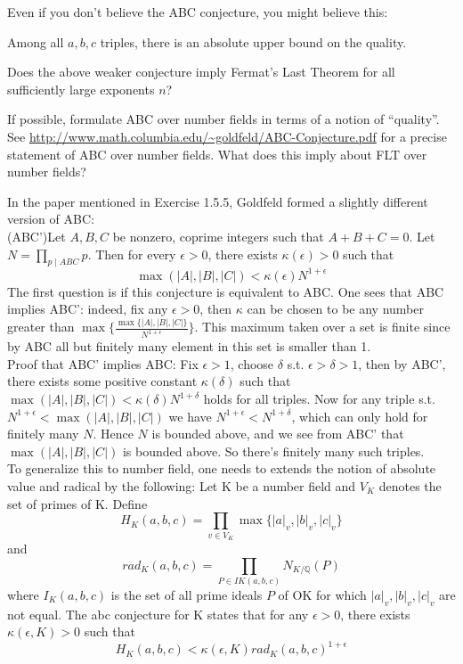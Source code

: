 \documentclass{book}
\begin{document}
Even if you don't believe the ABC conjecture, you might believe this:
\begin{conjecture}
Among all $a,b,c$ triples, there is an absolute upper
bound on the quality.
\end{conjecture}

\begin{exercise}
Does the above weaker conjecture imply Fermat's Last Theorem for all sufficiently large exponents $n$?
\end{exercise}

\begin{exercise}
If possible, formulate ABC over number fields in terms of a notion of ``quality''.  See \url{http://www.math.columbia.edu/~goldfeld/ABC-Conjecture.pdf} for a precise statement of ABC over number fields.
What does this imply about FLT over number fields?
\end{exercise}

In the paper mentioned in Exercise 1.5.5, Goldfeld
formed a slightly different version of ABC: \\

(ABC')Let $A,B,C$ be nonzero, coprime integers such that
$A+B+C = 0$. Let $N = \prod_{p \mid ABC} p$.
Then for every $\epsilon >0$, there exists $\kappa(\epsilon)>0$
such that
\[ \max(|A|,|B|,|C|) < \kappa(\epsilon) N^{1+\epsilon} \]
The first question is if this conjecture is equivalent
to ABC. One sees that ABC implies ABC': indeed, fix
any $\epsilon >0$, then $\kappa$ can be chosen to be any number greater than $\max\{ \frac{\max\{|A|,|B|,|C|\}}{N^{1+\epsilon}}\}$. This maximum taken over a set is finite since by ABC all but finitely many element in
this set is smaller than 1. \\

Proof that ABC' implies ABC: Fix $\epsilon > 1$,
choose $\delta$ s.t. $\epsilon > \delta > 1$, then
by ABC', there exists some positive constant $\kappa(\delta)$
such that $\max(|A|,|B|,|C|) < \kappa(\delta) N^{1+\delta}$
holds for all triples. Now for any triple s.t. $N^{1+\epsilon} < \max(|A|,|B|,|C|)$ we have
$N^{1+\epsilon}< N^{1+\delta}$, which can only hold for
finitely many $N$. Hence $N$ is bounded above, and we see
from ABC' that $\max(|A|,|B|,|C|)$ is bounded above. So
there's finitely many such triples. \\


To generalize this to number field, one needs to extends
the notion of absolute value and radical by the following:
Let K be a number field and $V_K$ denotes the set of primes
of K. Define
\[
    H_K(a,b,c) = \prod_{v \in V_K} \max\{|a|_v,|b|_v,|c|_v\}
\]
and
\[
    rad_K(a,b,c) = \prod_{P \in IK(a,b,c)}N_{K/\mathbb{Q}}(P)
\]
where $I_K(a,b,c)$ is the set of all prime ideals $P$ of OK for which $|a|_v,|b|_v,|c|_v$ are not equal. The abc conjecture for K states that for any $\epsilon >0$,
there exists $\kappa(\epsilon, K)>0$
such that
\[
H_K(a,b,c) < \kappa(\epsilon, K) rad_K(a,b,c)^{1+\epsilon}
\]
\end{document}
